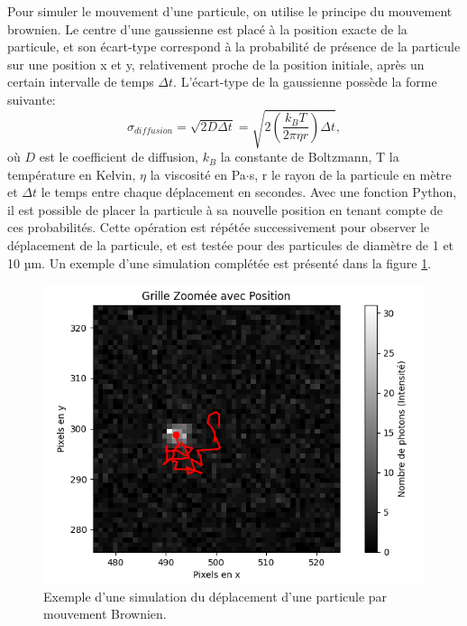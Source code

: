 \documentclass[conference]{IEEEtran}
\begin{document}
Pour simuler le mouvement d'une particule, on utilise le principe du mouvement brownien.
Le centre d'une gaussienne est placé à la position exacte de la particule, et son écart-type correspond à la probabilité de présence de la particule sur une position x et y, 
relativement proche de la position initiale, après un certain intervalle de temps $\Delta t$. L'écart-type de la gaussienne possède la forme suivante:
\begin{equation}
  \sigma_{diffusion} = \sqrt{2D\Delta t} = \sqrt{2\left ( \frac{k_{B}T}{2\pi \eta r} \right )\Delta t},
\end{equation}
où $D$ est le coefficient de diffusion, $k_{B}$ la constante de Boltzmann, T la température en Kelvin, $\eta$ la viscosité en Pa$\cdot$s, r le rayon de la particule en mètre et $\Delta t$ le temps entre chaque déplacement en secondes. 
Avec une fonction Python, il est possible de placer la particule à sa nouvelle position en tenant compte de ces probabilités. Cette opération est répétée successivement pour observer 
le déplacement de la particule, et est testée pour des particules de diamètre de 1 et 10 µm. Un exemple d'une simulation complétée est présenté dans la figure \ref{simu}.

\begin{figure}
  \centering
  \includegraphics[scale=0.5]{Blob-lamb=405nm-Mtheo=60-NA=0,85-Taille=1um_sized.png}
  \caption{Exemple d'une simulation du déplacement d'une particule par mouvement Brownien.}
  \label{simu}
\end{figure}
\end{document}
